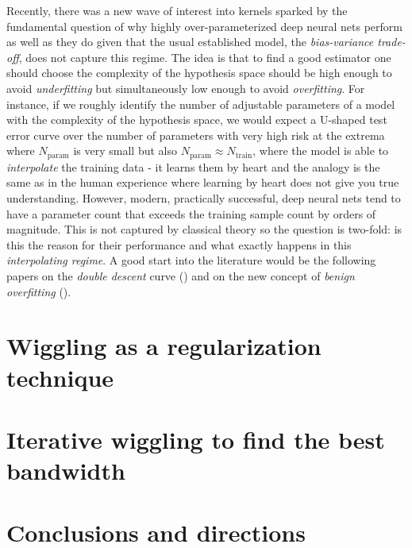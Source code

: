\documentclass[12pt]{amsart}
\begin{document}
Recently, there was a new wave of interest into kernels sparked by the 
fundamental question of why highly over-parameterized deep neural nets
perform as well as they do given that the usual established model, 
the \emph{bias-variance trade-off}, does not capture this regime.
The idea is that to find a good estimator one should choose the 
complexity of the hypothesis space should be high enough to avoid 
\emph{underfitting} but simultaneously low enough to avoid 
\emph{overfitting}.
For instance, if we roughly identify the number of adjustable parameters
of a model with the complexity of the hypothesis space, we would expect
a U-shaped test error curve over the number of parameters with very high
risk at the extrema where $N_{\textrm{param}}$ is very small but also
$N_{\textrm{param}} \approx N_{\textrm{train}}$, where the model is able
to \emph{interpolate} the training data - it learns them by heart and 
the analogy is the same as in the human experience where learning by heart
does not give you true understanding.
However, modern, practically successful, deep neural nets tend to have a
parameter count that exceeds the training sample count by orders of 
magnitude.
This is not captured by classical theory so the question is two-fold:
is this the reason for their performance and 
what exactly happens in this \emph{interpolating regime}.
A good start into the literature would be the following papers on 
the \emph{double descent} curve (\cite{doubledescent}) and on the new 
concept of \emph{benign overfitting} (\cite{benignoverfitting}).

\section{Wiggling as a regularization technique}

\section{Iterative wiggling to find the best bandwidth}

\section{Conclusions and directions}
\end{document}
